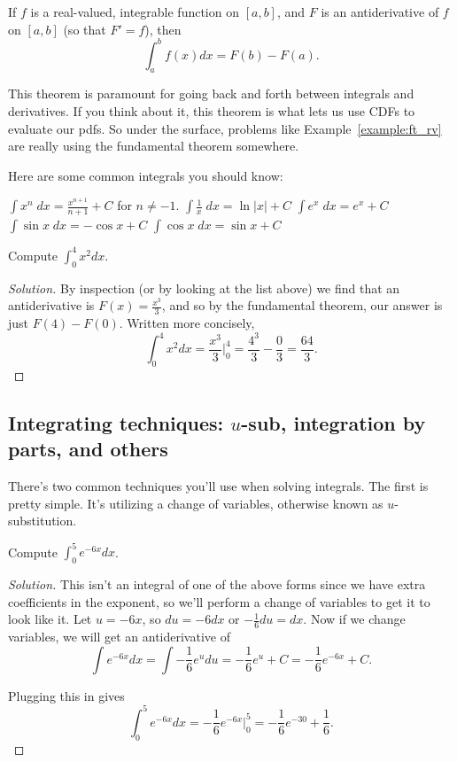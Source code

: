\documentclass[11 pt]{scrartcl}
\begin{document}
\begin{theorem}
    If $f$ is a real-valued, integrable function on $[a,b]$, and $F$ is an antiderivative of $f$ on $[a,b]$ (so that $F' = f$), then 
    \[ \int_a^b f(x) dx = F(b) - F(a).\] 
\end{theorem}

This theorem is paramount for going back and forth between integrals and derivatives. If you think about it, this theorem is what lets us use CDFs to evaluate our pdfs. So under the surface, problems like Example~\ref{example:ft_rv} are really using the fundamental theorem somewhere. 


Here are some common integrals you should know: 
\begin{itemize}
    \ii $\int x^n\; dx = \frac{x^{n+1}}{n+1} + C$ for $n \not= -1$. 
    \ii $\int \frac{1}{x}\; dx = \ln |x| + C$
    \ii $\int e^x\; dx = e^x + C$ 
    \ii $\int \sin x\; dx = - \cos x + C$
    \ii $\int \cos x\; dx = \sin x + C$
\end{itemize}

\begin{example}
    Compute $\int_0^4 x^2 dx$. 
\end{example}
\begin{proof}[Solution]
    By inspection (or by looking at the list above) we find that an antiderivative is $F(x) = \frac{x^3}{3}$, and so by the fundamental theorem, our answer is just $F(4) - F(0)$. Written more concisely, 
    \[ \int_0^4 x^2 dx = \dfrac{x^3}{3}\Big\rvert^4_0 = \dfrac{4^3}{3} - \dfrac{0}{3} = \dfrac{64}{3}.\] 
\end{proof}

\subsection{Integrating techniques: $u$-sub, integration by parts, and others}
There's two common techniques you'll use when solving integrals. The first is pretty simple. It's utilizing a change of variables, otherwise known as $u$-substitution. 

\begin{example}
    Compute $\int_0^5 e^{-6x}dx$. 
\end{example}
\begin{proof}[Solution]
    This isn't an integral of one of the above forms since we have extra coefficients in the exponent, so we'll perform a change of variables to get it to look like it. Let $u = -6x$, so $du = -6 dx$ or $-\frac 16 du = dx$. Now if we change variables, we will get an antiderivative of 
    \[\int e^{-6x} dx = \int -\frac 16 e^{u} du = -\frac 16 e^u + C = -\frac 16 e^{-6x} + C.\] 
    
    Plugging this in gives 
\[ \int_0^5 e^{-6x} dx = -\frac 16 e^{-6x} \Big\rvert^5_0 = -\frac 16 e^{-30} + \frac 16 .\]
\end{proof}
\end{document}
